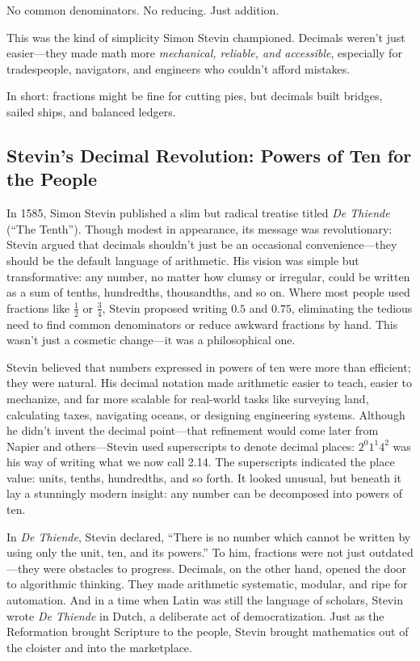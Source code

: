 No common denominators. No reducing. Just addition.

This was the kind of simplicity Simon Stevin championed. Decimals weren’t just easier—they made math more \textit{mechanical, reliable, and accessible}, especially for tradespeople, navigators, and engineers who couldn’t afford mistakes.


In short: fractions might be fine for cutting pies, but decimals built bridges, sailed ships, and balanced ledgers.

\subsection{Stevin’s Decimal Revolution: Powers of Ten for the People}

In 1585, Simon Stevin published a slim but radical treatise titled \textit{De Thiende} (“The Tenth”). Though modest in appearance, its message was revolutionary: Stevin argued that decimals shouldn’t just be an occasional convenience—they should be the default language of arithmetic. His vision was simple but transformative: any number, no matter how clumsy or irregular, could be written as a sum of tenths, hundredths, thousandths, and so on. Where most people used fractions like \( \frac{1}{2} \) or \( \frac{3}{4} \), Stevin proposed writing \( 0.5 \) and \( 0.75 \), eliminating the tedious need to find common denominators or reduce awkward fractions by hand. This wasn’t just a cosmetic change—it was a philosophical one.

Stevin believed that numbers expressed in powers of ten were more than efficient; they were natural. His decimal notation made arithmetic easier to teach, easier to mechanize, and far more scalable for real-world tasks like surveying land, calculating taxes, navigating oceans, or designing engineering systems. Although he didn’t invent the decimal point—that refinement would come later from Napier and others—Stevin used superscripts to denote decimal places: \( 2^{0}1^{1}4^{2} \) was his way of writing what we now call 2.14. The superscripts indicated the place value: units, tenths, hundredths, and so forth. It looked unusual, but beneath it lay a stunningly modern insight: any number can be decomposed into powers of ten.

In \textit{De Thiende}, Stevin declared, ``There is no number which cannot be written by using only the unit, ten, and its powers.'' To him, fractions were not just outdated—they were obstacles to progress. Decimals, on the other hand, opened the door to algorithmic thinking. They made arithmetic systematic, modular, and ripe for automation. And in a time when Latin was still the language of scholars, Stevin wrote \textit{De Thiende} in Dutch, a deliberate act of democratization. Just as the Reformation brought Scripture to the people, Stevin brought mathematics out of the cloister and into the marketplace.


